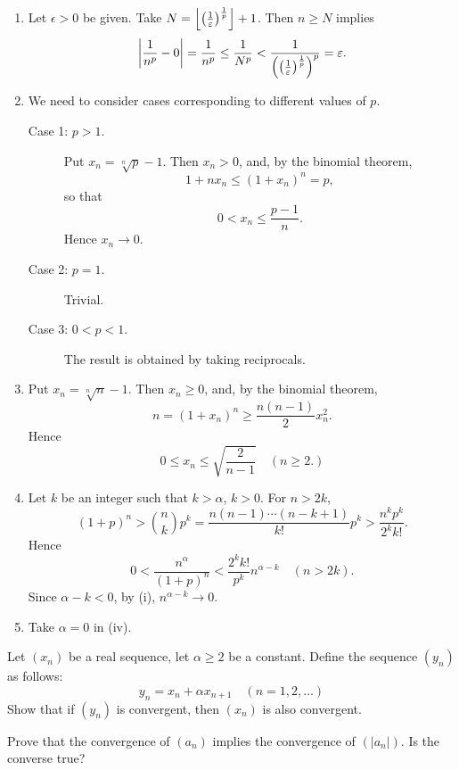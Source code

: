 \begin{solution} \
\begin{enumerate}[label=(\roman*)]
\item Let $\epsilon>0$ be given. Take $N=\left\lfloor \left(\frac{1}{\varepsilon}\right)^\frac{1}{p} \right\rfloor+1$. Then $n\ge N$ implies
\[\left|\frac{1}{n^p}-0\right|=\frac{1}{n^p}\le\frac{1}{N^p}<\frac{1}{\left(\left(\frac{1}{\varepsilon}\right)^\frac{1}{p}\right)^p}=\varepsilon.\]
\item We need to consider cases corresponding to different values of $p$.
\begin{description}
\item[Case 1: $p>1$.] Put $x_n=\sqrt[n]{p}-1$. Then $x_n>0$, and, by the binomial theorem,
\[1+nx_n\le(1+x_n)^n=p,\]
so that
\[0<x_n\le\frac{p-1}{n}.\]
Hence $x_n\to0$.

\item[Case 2: $p=1$.] Trivial.
\item[Case 3: $0<p<1$.] The result is obtained by taking reciprocals.
\end{description}

\item Put $x_n=\sqrt[n]{n}-1$. Then $x_n\ge0$, and, by the binomial theorem,
\[n=(1+x_n)^n\ge\frac{n(n-1)}{2}x_n^2.\]
Hence
\[0\le x_n\le\sqrt{\frac{2}{n-1}}\quad(n\ge2.)\]

\item Let $k$ be an integer such that $k>\alpha$, $k>0$. For $n>2k$,
\[(1+p)^n>\binom{n}{k}p^k=\frac{n(n-1)\cdots(n-k+1)}{k!}p^k>\frac{n^k p^k}{2^k k!}.\]
Hence
\[0<\frac{n^\alpha}{(1+p)^n}<\frac{2^k k!}{p^k}n^{\alpha-k}\quad(n>2k).\]
Since $\alpha-k<0$, by (i), $n^{\alpha-k}\to0$.

\item Take $\alpha=0$ in (iv).
\end{enumerate}
\end{solution}

\begin{exercise}
Let $(x_n)$ be a real sequence, let $\alpha\ge2$ be a constant. Define the sequence $(y_n)$ as follows:
\[y_n=x_n+\alpha x_{n+1}\quad(n=1,2,\dots)\]
Show that if $(y_n)$ is convergent, then $(x_n)$ is also convergent.
\end{exercise}

\begin{exercise}
Prove that the convergence of $(a_n)$ implies the convergence of $(|a_n|)$. Is the converse true?
\end{exercise}

